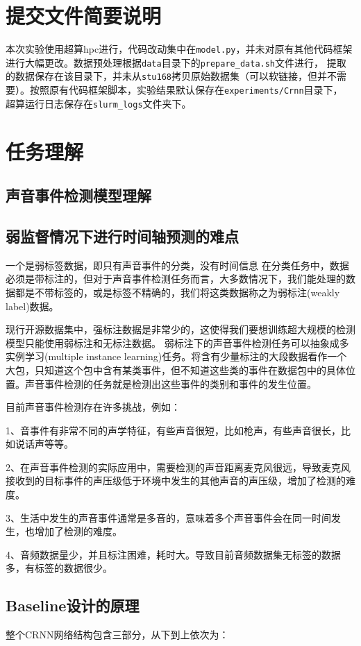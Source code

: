 \documentclass[]{ctexart}
\begin{document}
\section{提交文件简要说明}
本次实验使用超算hpc进行，代码改动集中在\texttt{model.py}，并未对原有其他代码框架进行大幅更改。数据预处理根据\texttt{data}目录下的\texttt{prepare\_data.sh}文件进行，
提取的数据保存在该目录下，并未从\texttt{stu168}拷贝原始数据集（可以软链接，但并不需要）。按照原有代码框架脚本，实验结果默认保存在\texttt{experiments/Crnn}目录下，
超算运行日志保存在\texttt{slurm\_logs}文件夹下。
\section{任务理解}

\subsection{声音事件检测模型理解}

\subsection{弱监督情况下进行时间轴预测的难点}
一个是弱标签数据，即只有声音事件的分类，没有时间信息
在分类任务中，数据必须是带标注的，但对于声音事件检测任务而言，大多数情况下，我们能处理的数据都是不带标签的，或是标签不精确的，我们将这类数据称之为弱标注(weakly label)数据。

现行开源数据集中，强标注数据是非常少的，这使得我们要想训练超大规模的检测模型只能使用弱标注和无标注数据。
弱标注下的声音事件检测任务可以抽象成多实例学习(multiple instance learning)任务。将含有少量标注的大段数据看作一个大包，只知道这个包中含有某类事件，但不知道这些类的事件在数据包中的具体位置。声音事件检测的任务就是检测出这些事件的类别和事件的发生位置。

目前声音事件检测存在许多挑战，例如：

1、音事件有非常不同的声学特征，有些声音很短，比如枪声，有些声音很长，比如说话声等等。

2、在声音事件检测的实际应用中，需要检测的声音距离麦克风很远，导致麦克风接收到的目标事件的声压级低于环境中发生的其他声音的声压级，增加了检测的难度。

3、生活中发生的声音事件通常是多音的，意味着多个声音事件会在同一时间发生，也增加了检测的难度。

4、音频数据量少，并且标注困难，耗时大。导致目前音频数据集无标签的数据多，有标签的数据很少。

\subsection{Baseline设计的原理}
整个CRNN网络结构包含三部分，从下到上依次为：
\end{document}
